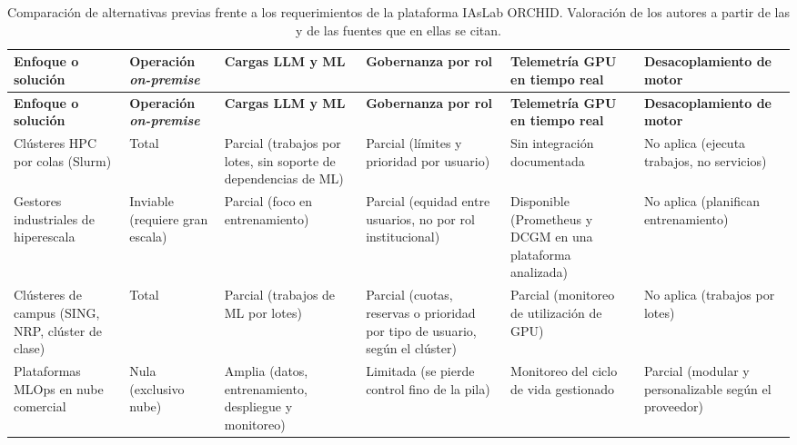 {\footnotesize
\setlength{\tabcolsep}{4pt}
\begin{xltabular}{\textwidth}{>{\raggedright\arraybackslash}p{0.19\textwidth} >{\raggedright\arraybackslash}p{0.12\textwidth} >{\raggedright\arraybackslash}p{0.13\textwidth} >{\raggedright\arraybackslash}p{0.15\textwidth} >{\raggedright\arraybackslash}p{0.14\textwidth} >{\raggedright\arraybackslash}X}
        \caption[Comparación de alternativas previas frente a los requerimientos de la plataforma]{Comparación de alternativas previas frente a los requerimientos de la plataforma IAsLab ORCHID. Valoración de los autores a partir de las  y de las fuentes que en ellas se citan.}
        \label{tab:estado-del-arte-comparacion} \\
        \toprule
        \textbf{Enfoque o solución} & \textbf{Operación \emph{on-premise}} & \textbf{Cargas LLM y ML} & \textbf{Gobernanza por rol} & \textbf{Telemetría GPU en tiempo real} & \textbf{Desacoplamiento de motor} \\
        \midrule
        \endfirsthead
        \toprule
        \textbf{Enfoque o solución} & \textbf{Operación \emph{on-premise}} & \textbf{Cargas LLM y ML} & \textbf{Gobernanza por rol} & \textbf{Telemetría GPU en tiempo real} & \textbf{Desacoplamiento de motor} \\
        \midrule
        \endhead
        \bottomrule
        \endfoot
        Clústeres HPC por colas (Slurm) & Total & Parcial (trabajos por lotes, sin soporte de dependencias de ML) & Parcial (límites y prioridad por usuario) & Sin integración documentada & No aplica (ejecuta trabajos, no servicios) \\
        Gestores industriales de hiperescala & Inviable (requiere gran escala) & Parcial (foco en entrenamiento) & Parcial (equidad entre usuarios, no por rol institucional) & Disponible (Prometheus y DCGM en una plataforma analizada) & No aplica (planifican entrenamiento) \\
        Clústeres de campus (SING, NRP, clúster de clase) & Total & Parcial (trabajos de ML por lotes) & Parcial (cuotas, reservas o prioridad por tipo de usuario, según el clúster) & Parcial (monitoreo de utilización de GPU) & No aplica (trabajos por lotes) \\
        Plataformas MLOps en nube comercial & Nula (exclusivo nube) & Amplia (datos, entrenamiento, despliegue y monitoreo) & Limitada (se pierde control fino de la pila) & Monitoreo del ciclo de vida gestionado & Parcial (modular y personalizable según el proveedor) \\

\end{xltabular}}
